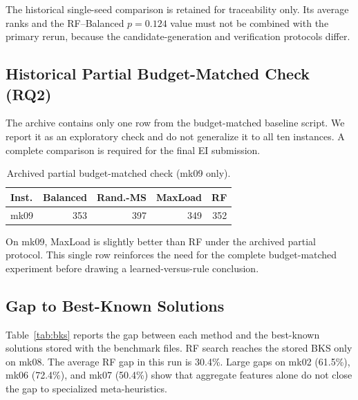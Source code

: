 \documentclass[12pt]{article}
\begin{document}
The historical single-seed comparison is retained for traceability only. Its average ranks and the RF--Balanced $p=0.124$ value must not be combined with the primary rerun, because the candidate-generation and verification protocols differ.

\subsection{Historical Partial Budget-Matched Check (RQ2)}

The archive contains only one row from the budget-matched baseline script. We report it as an exploratory check and do not generalize it to all ten instances. A complete comparison is required for the final EI submission.

\begin{table}[htbp]\centering\caption{Archived partial budget-matched check (mk09 only).}\label{tab:fair}
\begin{tabular}{lrrrr}\toprule
Inst. & Balanced & Rand.\!-\!MS & MaxLoad & RF \\ \midrule
mk09 & 353 & 397 & 349 & 352 \\ \bottomrule
\end{tabular}
\end{table}

On mk09, MaxLoad is slightly better than RF under the archived partial protocol. This single row reinforces the need for the complete budget-matched experiment before drawing a learned-versus-rule conclusion.

\subsection{Gap to Best-Known Solutions}

Table~\ref{tab:bks} reports the gap between each method and the best-known solutions stored with the benchmark files. RF search reaches the stored BKS only on mk08. The average RF gap in this run is 30.4\%. Large gaps on mk02 (61.5\%), mk06 (72.4\%), and mk07 (50.4\%) show that aggregate features alone do not close the gap to specialized meta-heuristics.
\end{document}
